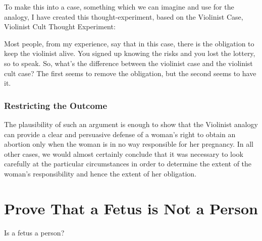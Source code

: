  To make this into a case, something which we can imagine and use for the analogy, I have created this thought-experiment, based on the Violinist Case, Violinist Cult Thought Experiment:


Most people, from my experience, say that in this case, there is the obligation to keep the violinist alive. You signed up knowing the risks and you lost the lottery, so to speak. So, what's the difference between the violinist case and the violinist cult case? The first seems to remove the obligation, but the second seems to have it. 

\subsubsection{Restricting the Outcome}

The plausibility of such an argument is enough to show that the Violinist analogy can provide a clear and persuasive defense of a woman’s right to obtain an abortion only when the woman is in no way responsible for her pregnancy. In all other cases, we would almost certainly conclude that it was necessary to look carefully at the particular circumstances in order to determine the extent of the woman’s responsibility and hence the extent of her obligation.

\section{Prove That a Fetus is Not a Person}
\begin{center}Is a fetus a person?\end{center}

